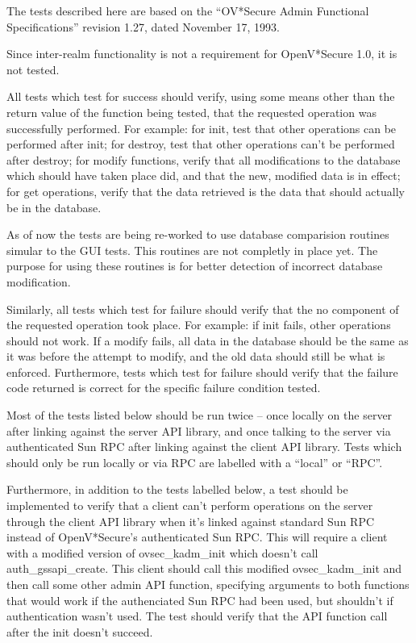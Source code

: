 The tests described here are based on the ``OV*Secure Admin Functional
Specifications'' revision 1.27, dated November 17, 1993.

Since inter-realm functionality is not a requirement for OpenV*Secure
1.0, it is not tested.

All tests which test for success should verify, using some means other
than the return value of the function being tested, that the requested
operation was successfully performed.  For example: for init, test
that other operations can be performed after init; for destroy, test
that other operations can't be performed after destroy; for modify
functions, verify that all modifications to the database which should
have taken place did, and that the new, modified data is in effect;
for get operations, verify that the data retrieved is the data that
should actually be in the database.

As of now the tests are being re-worked to use database comparision routines
simular to the GUI tests.  This routines are not completly in place yet. The
purpose for using these routines is for better detection of incorrect
database modification.

Similarly, all tests which test for failure should verify that the
no component of the requested operation took place.  For example: if
init fails, other operations should not work.  If a modify fails, all
data in the database should be the same as it was before the attempt
to modify, and the old data should still be what is enforced.
Furthermore, tests which test for failure should verify that the
failure code returned is correct for the specific failure condition
tested.

Most of the tests listed below should be run twice -- once locally on
the server after linking against the server API library, and once
talking to the server via authenticated Sun RPC after linking against
the client API library.  Tests which should only be run locally or via
RPC are labelled with a ``local'' or ``RPC''.

Furthermore, in addition to the tests labelled below, a test should be
implemented to verify that a client can't perform operations on the
server through the client API library when it's linked against
standard Sun RPC instead of OpenV*Secure's authenticated Sun RPC.
This will require a client with a modified version of ovsec_kadm_init
which doesn't call auth_gssapi_create.  This client should call this
modified ovsec_kadm_init and then call some other admin API function,
specifying arguments to both functions that would work if the
authenciated Sun RPC had been used, but shouldn't if authentication
wasn't used.  The test should verify that the API function call after
the init doesn't succeed.

